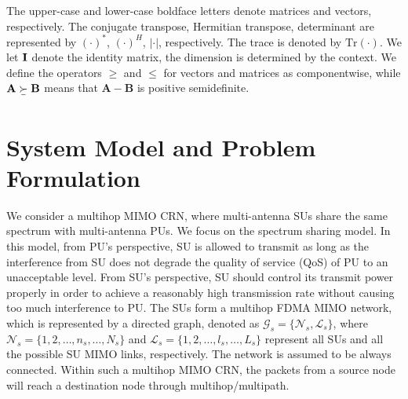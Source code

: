 \documentclass[12pt,onecolumn,tworows]{IEEEtran}
\begin{document}
The upper-case and lower-case boldface letters denote matrices and vectors, respectively. The conjugate transpose, Hermitian transpose, determinant are represented by ${( \cdot )^*}$, ${(\cdot)^H}$, $\left|\cdot  \right|$, respectively. The trace is denoted by $\text{Tr}( \cdot )$. We let ${{\bf{I}}}$ denote the identity matrix, the dimension is determined by the context. We define the operators $ \ge $ and $ \le $ for vectors and matrices as componentwise, while ${\mathbf{A}}\underset{\raise0.3em\hbox{$\smash{\scriptscriptstyle-}$}}{ \succ } {\mathbf{B}}$ means that ${\mathbf{A}}-{\mathbf{B}}$ is positive semidefinite.

\section{System Model and Problem Formulation}
We consider a multihop MIMO CRN, where multi-antenna SUs share the same spectrum with multi-antenna PUs.
We focus on the spectrum sharing model. In this model, from PU's perspective, SU is allowed to transmit as long as the
interference from SU does not degrade the quality of service
(QoS) of PU to an unacceptable level. From SU's perspective,
SU should control its transmit power properly in order to
achieve a reasonably high transmission rate without causing
too much interference to PU.
The SUs form a multihop FDMA MIMO network, which is represented by a directed graph, denoted as ${\mathcal{G} _s} = \{ {\mathcal{N} }_s,{\mathcal{L}}_s\}$, where ${\mathcal{N}}_s = \{ 1,2,\ldots,n_s,\ldots,N_s\} $ and ${\mathcal{L}}_s = \{ 1,2,\ldots,l_s,\ldots,L_s\}$ represent all SUs and all the possible SU MIMO links, respectively. The network is assumed to be always connected. Within such a multihop MIMO CRN, the packets from a source node will reach a destination
node through multihop/multipath.
\end{document}

